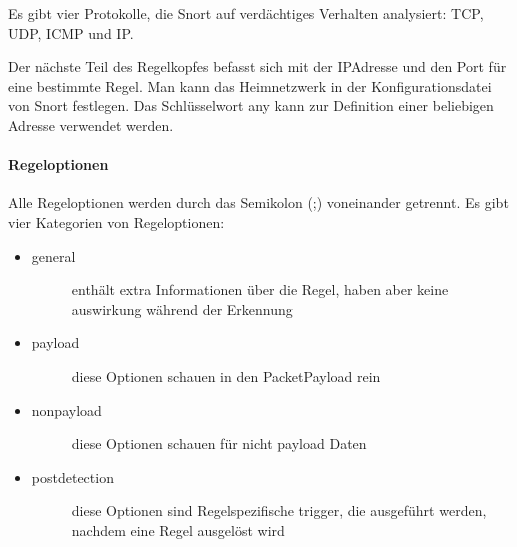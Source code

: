 \documentclass[letterpaper,10pt,ngerman]{sphinxmanual}
\begin{document}

Es gibt vier Protokolle, die Snort auf verdächtiges Verhalten analysiert: TCP,
UDP, ICMP und IP.


Der nächste Teil des Regelkopfes befasst sich mit der IP\sphinxhyphen{}Adresse und den Port
für eine bestimmte Regel. Man kann das Heimnetzwerk in der Konfigurationsdatei
von Snort festlegen. Das Schlüsselwort any kann zur Definition einer beliebigen
Adresse verwendet werden.


\paragraph{Regeloptionen}
\label{\detokenize{ids:regeloptionen}}
Alle Regeloptionen werden durch das Semikolon (;) voneinander getrennt.
Es gibt vier Kategorien von Regeloptionen:
\begin{itemize}
\item {} \begin{description}
\item[{general}] \leavevmode
enthält extra Informationen über die Regel, haben aber keine auswirkung während der Erkennung

\end{description}

\item {} \begin{description}
\item[{payload}] \leavevmode
diese Optionen schauen in den Packet\sphinxhyphen{}Payload rein

\end{description}

\item {} \begin{description}
\item[{non\sphinxhyphen{}payload}] \leavevmode
diese Optionen schauen für nicht payload Daten

\end{description}

\item {} \begin{description}
\item[{post\sphinxhyphen{}detection}] \leavevmode
diese Optionen sind Regelspezifische trigger, die ausgeführt werden, nachdem eine Regel ausgelöst wird

\end{description}

\end{itemize}
\end{document}
